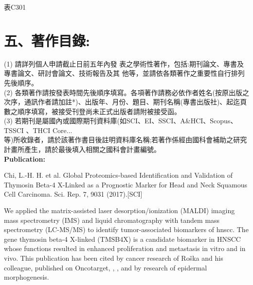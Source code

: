 \documentclass[12pt, a4paper]{article}
\newcommand{\cntext}[1]{\begin{CJK*}{UTF8}{bkai}#1\end{CJK*}}
\begin{document}
\begin{CJK*}{UTF8}{bkai}
表C301
\section*{五、著作目錄:}


(1) 請詳列個人申請截止日前五年內發 表之學術性著作，包括:期刊論文、專書及專書論文、研討會論文、技術報告及其 他等，並請依各類著作之重要性自行排列先後順序。\\
(2) 各類著作請按發表時間先後順序填寫。各項著作請務必依作者姓名(按原出版之 次序，通訊作者請加註*)、出版年、月份、題目、期刊名稱(專書出版社)、起迄頁數之順序填寫，被接受刊登尚未正式出版者請附被接受函。\\
(3) 若期刊是屬國內或國際期刊資料庫(如SCI、EI、SSCI、A\&HCI、Scopus、TSSCI 、THCI Core...\\等)所收錄者，請於該著作書目後註明資料庫名稱;若著作係經由國科會補助之研究計畫所產生，請於最後填入相關之國科會計畫編號。\\

\textbf{Publication:}\\
\begin{outline}
\1 Chi, L.-H. H. et al. Global Proteomics-based Identification and Validation of Thymosin Beta-4 X-Linked as a Prognostic Marker for Head and Neck Squamous Cell Carcinoma. Sci. Rep. 7, 9031 (2017).[SCI]

\end{outline}

We applied the matrix-assisted laser desorption/ionization (MALDI) imaging mass spectrometry (IMS) and liquid chromatography with tandem mass spectrometry (LC-MS/MS) to identify tumor-associated biomarkers of \acrshort{hnscc}. The gene thymosin beta-4 X-linked (TMSB4X) is a candidate biomarker in HNSCC whose functions resulted in enhanced proliferation and metastasis in vitro and in vivo\citep{Chi2017}.
This publication has been cited by cancer research of Roška and his colleague, published on Oncotarget\citep{Roska2020}, \citep{Chu2019a}, \citep{Makowiecka2019a}, and by research of epidermal morphogenesis\citep{Padmanabhan2020}.



\end{CJK*}
\end{document}
